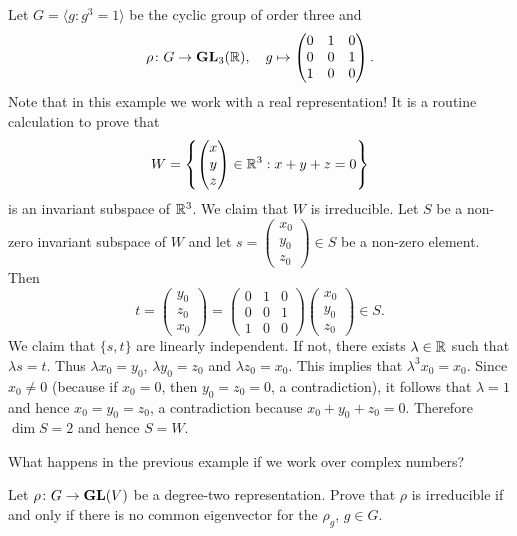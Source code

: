\begin{example}
    Let $G=\langle g:g^3=1\rangle$ be the
    cyclic group of order three
    and
    \[
    \rho\colon G\to\mathbf{GL}_3(\mathbb{R}),
    \quad
    g\mapsto\begin{pmatrix}
        0&1&0\\
        0&0&1\\
        1&0&0
    \end{pmatrix}.
    \]
    Note that in this example we work with a real representation! 
    It is a routine calculation to prove that 
    \[
    W=\left\{
    \begin{pmatrix}
    x\\
    y\\
    z
    \end{pmatrix}\in\mathbb{R}^3:x+y+z=0\right\}
    \]
    is an invariant subspace of $\mathbb{R}^3$. We claim that $W$ 
    is irreducible. Let $S$ be a non-zero invariant subspace of 
    $W$ and let $s=\begin{pmatrix}x_0\\y_0\\z_0\end{pmatrix}\in S$ be a non-zero element. Then
    \[
    t=\begin{pmatrix}y_0\\z_0\\x_0\end{pmatrix}
    =\begin{pmatrix}
        0&1&0\\
        0&0&1\\
        1&0&0
    \end{pmatrix}
    \begin{pmatrix}x_0\\y_0\\z_0\end{pmatrix}\in S.
    \]
    We claim that $\{s,t\}$ are linearly independent. If not, there exists $\lambda\in\mathbb{R}$ such that
    $\lambda s=t$. Thus $\lambda x_0=y_0$, $\lambda y_0=z_0$ and $\lambda z_0=x_0$. This implies that
    $\lambda^3x_0=x_0$. Since $x_0\ne 0$ (because if $x_0=0$, then $y_0=z_0=0$, a contradiction), it follows that
    $\lambda=1$ and hence $x_0=y_0=z_0$, a contradiction because $x_0+y_0+z_0=0$.
    Therefore $\dim S=2$ and hence $S=W$.
\end{example}

What happens in the previous example if we work over complex numbers?

\begin{exercise}
    Let $\rho\colon G\to\mathbf{GL}(V)$ be a degree-two representation. Prove that
    $\rho$ is irreducible if and only if there is no common eigenvector for the $\rho_g$, $g\in G$.
\end{exercise}

